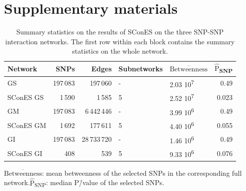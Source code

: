 \documentclass[draft,twocolumn, 11pt]{article}
\newcommand{\mean}[1]{$\overline{\mbox{#1}}$}
\newcommand{\median}[1]{$\hat{\mbox{#1}}$}
\begin{document}



\clearpage
\setcounter{figure}{0}
\setcounter{section}{0}
\setcounter{table}{0}

\section{Supplementary materials}

\begin{table}[htbp]
\begin{threeparttable}
\caption{Summary statistics on the results of SConES on the three SNP-SNP interaction networks. The first row within each block contains the summary statistics on the whole network.}
\label{tab:snp_solutions}
\centering
\begin{tabular}{lrrllr}
Network & SNPs & Edges & Subnetworks & \mean{Betweenness} & \median{P}\textsubscript{SNP}\\
\hline
GS & 197\,083 & 197\,060 & - & 2.03 \texttimes{} 10\textsuperscript{7} & 0.49\\
SConES GS & 1\,590 & 1\,585 & 5 & 2.52 \texttimes{} 10\textsuperscript{7} & 0.023\\
\hline
GM & 197\,083 & 6\,442\,446 & - & 3.99 \texttimes{} 10\textsuperscript{6} & 0.49\\
SConES GM & 1\,692 & 177\,611 & 5 & 4.40 \texttimes{} 10\textsuperscript{6} & 0.055\\
\hline
GI & 197\,083 & 28\,733\,720 & - & 1.46 \texttimes{} 10\textsuperscript{6} & 0.49\\
SConES GI & 408 & 539 & 5 & 9.33 \texttimes{} 10\textsuperscript{6} & 0.076\\
\end{tabular}
\begin{tablenotes}
  \footnotesize{
    \item \mean{Betweenness}: mean betweenness of the selected SNPs in the corresponding full network.\median{P}\textsubscript{SNP}: median P\=/value of the selected SNPs.
  }
\end{tablenotes}
\end{threeparttable}
\end{table}
\end{document}
